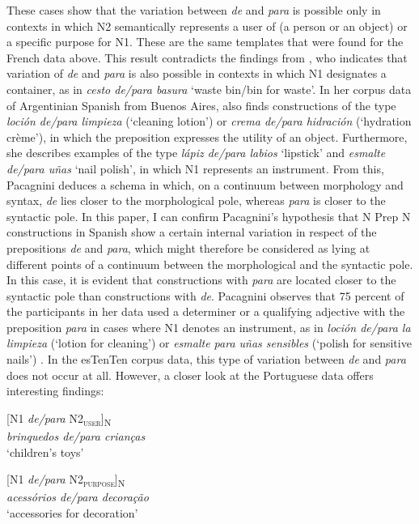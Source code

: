 \documentclass[output=paper]{langsci/langscibook}
\begin{document}
These cases show that the variation between \textit{de} and \textit{para} is possible only in contexts in which N2 semantically represents a user of (a person or an object) or a specific purpose for N1. These are the same templates that were found for the French data above. This result contradicts the findings from \citet{Lopez:1970}, who indicates that variation of \textit{de} and \textit{para} is also possible in contexts in which N1 designates a container, as in \textit{cesto de/para basura} `waste bin/bin for waste'. In her corpus data of Argentinian Spanish from Buenos Aires, \citet[164]{Pacagnini:2003} also finds constructions of the type \textit{loción de/para limpieza} (`cleaning lotion') or \textit{crema de/para hidración} (`hydration crème'), in which the preposition expresses the utility of an object. Furthermore, she describes examples of the type \textit{lápiz de/para labios} `lipstick' and \textit{esmalte de/para uñas} `nail polish', in which N1 represents an instrument. From this, Pacagnini deduces a schema in which, on a continuum between morphology and syntax, \textit{de} lies closer to the morphological pole, whereas \textit{para} is closer to the syntactic pole. In this paper, I can confirm Pacagnini’s hypothesis that N Prep N constructions in Spanish show a certain internal variation in respect of the prepositions \textit{de} and \textit{para}, which might therefore be considered as lying at different points of a continuum between the morphological and the syntactic pole. In this case, it is evident that constructions with \textit{para} are located closer to the syntactic pole than constructions with \textit{de}. Pacagnini observes that 75 percent of the participants in her data used a determiner or a qualifying adjective with the preposition \textit{para} in cases where N1 denotes an instrument, as in \textit{loción de/para la limpieza} (`lotion for cleaning') or \textit{esmalte para uñas sensibles} (`polish for sensitive nails') \citep[166]{Pacagnini:2003}. In the esTenTen corpus data, this type of variation between \textit{de} and \textit{para} does not occur at all. However, a closer look at the Portuguese data offers interesting findings:

\begin{exe}\ex\begin{minipage}[t]{0.4\textwidth}    %
[N1 \textit{de/para} N2\textsubscript{\scshape user}]\textsubscript{N}\\
\textit{brinquedos de/para crianças}\\
`children’s toys'
\end{minipage}\hfill%
\begin{minipage}[t]{0.45\textwidth}
[N1 \textit{de/para} N2\textsubscript{\scshape purpose}]\textsubscript{N}\\
\textit{acessórios de/para decoração}\\
`accessories for decoration'
\end{minipage}
\end{exe}
\end{document}

